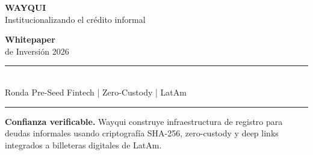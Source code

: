 \documentclass[11pt,a4paper]{article}
\begin{document}
\begin{titlepage}
    \thispagestyle{empty}
    
    \vspace*{2cm}
    \begin{flushleft}
        {\fontsize{48}{52}\selectfont\bfseries\color{wayquiInk} WAYQUI}\\[0.5cm]
        {\Large\color{wayquiSlate} Institucionalizando el cr\'edito informal}
    \end{flushleft}

    \vspace{2.5cm}
    \begin{flushleft}
        {\fontsize{32}{36}\selectfont\bfseries\color{wayquiLimeDark}Whitepaper}\\[0.2cm]
        {\fontsize{18}{22}\selectfont\color{wayquiSlate}de Inversi\'on 2026}
    \end{flushleft}

    \vspace{2cm}
    \begin{flushleft}
        \textcolor{wayquiLine}{\rule{8cm}{1pt}}\\[0.6cm]
        {\normalsize\color{wayquiSlate}Ronda Pre-Seed Fintech | Zero-Custody | LatAm}\\[0.4cm]
        \textcolor{wayquiLine}{\rule{8cm}{1pt}}
    \end{flushleft}
    
    \vspace{1.5cm}
    \begin{flushleft}
        \begin{minipage}{0.9\textwidth}
            \begin{keybox}
            {\bfseries\color{wayquiLimeDark}Confianza verificable.} Wayqui construye infraestructura de registro para deudas informales usando criptograf\'ia SHA-256, zero-custody y deep links integrados a billeteras digitales de LatAm.
            \end{keybox}
        \end{minipage}
    \end{flushleft}

    \vfill
    

\end{titlepage}
\end{document}
